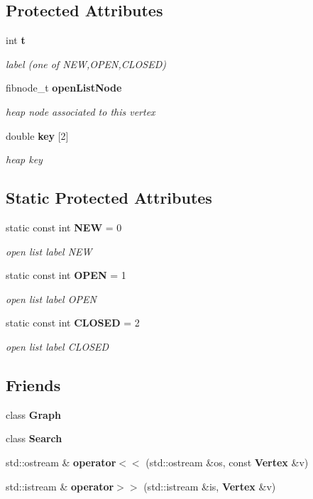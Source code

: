 \subsection*{Protected Attributes}
\begin{DoxyCompactItemize}
\item 
int {\bf t}
\begin{DoxyCompactList}\small\item\em label (one of N\-E\-W,O\-P\-E\-N,C\-L\-O\-S\-E\-D) \end{DoxyCompactList}\item 
fibnode\-\_\-t {\bf open\-List\-Node}
\begin{DoxyCompactList}\small\item\em heap node associated to this vertex \end{DoxyCompactList}\item 
double {\bf key} [2]
\begin{DoxyCompactList}\small\item\em heap key \end{DoxyCompactList}\end{DoxyCompactItemize}
\subsection*{Static Protected Attributes}
\begin{DoxyCompactItemize}
\item 
static const int {\bf N\-E\-W} = 0
\begin{DoxyCompactList}\small\item\em open list label N\-E\-W \end{DoxyCompactList}\item 
static const int {\bf O\-P\-E\-N} = 1
\begin{DoxyCompactList}\small\item\em open list label O\-P\-E\-N \end{DoxyCompactList}\item 
static const int {\bf C\-L\-O\-S\-E\-D} = 2
\begin{DoxyCompactList}\small\item\em open list label C\-L\-O\-S\-E\-D \end{DoxyCompactList}\end{DoxyCompactItemize}
\subsection*{Friends}
\begin{DoxyCompactItemize}
\item 
class {\bf Graph}
\item 
class {\bf Search}
\item 
std\-::ostream \& {\bf operator$<$$<$} (std\-::ostream \&os, const {\bf Vertex} \&v)
\item 
std\-::istream \& {\bf operator$>$$>$} (std\-::istream \&is, {\bf Vertex} \&v)
\end{DoxyCompactItemize}


